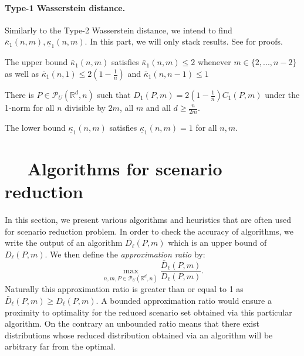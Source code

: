 \documentclass{amsart}
\newcommand{\RR}{\mathbb{R}}
\begin{document}
\paragraph{\textbf{Type-1 Wasserstein distance.}}
Similarly to the Type-2 Wasserstein distance, we intend to find $\bar{\kappa}_1\left(n,m\right), \underline\kappa_1\left(n,m\right)$. In this part, we will only stack results. See \cite[Section 3.2]{rujeerapaiboon_scenario_2022} for proofs.
\begin{theorem}
    The upper bound $\bar\kappa_1\left(n,m\right)$ satisfies $\bar\kappa_1\left(n,m\right)\leq2$ whenever $m\in\{2,...,n-2\}$ as well as $\bar\kappa_1\left(n,1\right)\leq2\left(1-\frac{1}{n}\right)$ and $\bar\kappa_1\left(n,n-1\right)\leq1$
\end{theorem}
\begin{proposition}
    There is $P\in\mathcal{P}_U\left(\RR^d,n\right)$ such that $D_1\left(P,m\right)=2\left(1-\frac{1}{n}\right)C_1\left(P,m\right)$ under the 1-norm for all $n$ divisible by $2m$, all $m$ and all $d\geq \frac{n}{2m}$.
\end{proposition}
\begin{proposition}
    The lower bound $\underline{\kappa}_1\left(n,m\right)$ satisfies $\underline{\kappa}_1\left(n,m\right)=1$ for all $n, m$.
\end{proposition}
\section{$\quad$ Algorithms for scenario reduction}
In this section, we present various algorithms and heuristics that are often used for scenario reduction problem. In order to check the accuracy of algorithms, we write the output of an algorithm $\bar{D_\ell}\left(P,m\right)$ which is an upper bound of   $D_\ell\left(P,m\right)$. We then define the \emph{approximation ratio} by: 
$$
\max_{n,m,P\in\mathcal{P}_U(\RR^d,n)}\frac{\bar{D}_\ell\left(P,m\right)}{D_\ell\left(P,m\right)}.
$$
Naturally this approximation ratio is greater than or equal to 1 as $\bar{D}_\ell\left(P,m\right)\geq D_\ell\left(P,m\right)$. A bounded approximation ratio would ensure a proximity to optimality for the reduced scenario set obtained via this particular algorithm. On the contrary an unbounded ratio means that there exist distributions whose reduced distribution obtained via an algorithm will be arbitrary far from the optimal.
\end{document}

